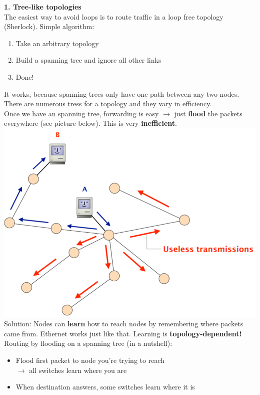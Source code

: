 \documentclass[a4paper, fontsize=8pt, landscape, DIV=1]{scrartcl}
\begin{document}
\begin{multicols*}{4}
			\textbf{1. Tree-like topologies}\\
			The easiest way to avoid loops is to route traffic in a loop free topology (Sherlock). Simple algorithm: 
			\begin{enumerate}[noitemsep]
				\item Take an arbitrary topology
				\item Build a spanning tree and ignore all other links
				\item Done!
			\end{enumerate}
			It works, because spanning trees only have one path between any two nodes. There are numerous tress for a topology and they vary in efficiency. \\
			Once we have an spanning tree, forwarding is easy $\rightarrow$ just \textbf{flood} the packets everywhere (see picture below). This is very \textbf{inefficient}. 
			\includegraphics[width=\columnwidth]{images/Concepts/flooding_1.png}
			Solution: Nodes can \textbf{learn} how to reach nodes by remembering where packets came from. Ethernet works just like that. Learning is \textbf{topology-dependent!}\\
			Routing by flooding on a spanning tree (in a nutshell):
			\begin{itemize}[noitemsep]
				\item Flood first packet to node you're trying to reach\\ $\rightarrow$ all switches learn where you are
				\item When destination answers, some switches learn where it is\\

\end{itemize}
\end{multicols*}
\end{document}
